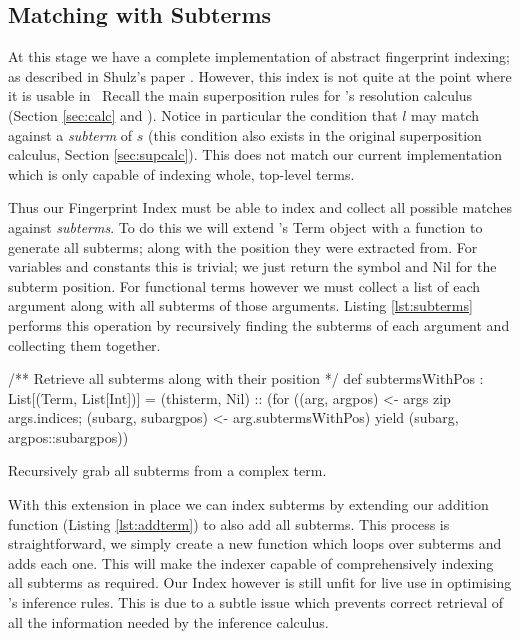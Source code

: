 \subsection{Matching with Subterms}

At this stage we have a complete implementation of abstract fingerprint indexing;
as described in Shulz's paper \cite{shulz12}. However, this index is not
quite at the point where it is usable in \beagle\ 
Recall the main superposition rules for \beagle's resolution calculus (Section \ref{sec:calc} and \cite{baum13}).
Notice in particular the condition that $l$ may match against a \emph{subterm}
of $s$ (this condition also exists in the original superposition calculus, Section \ref{sec:supcalc}).
This does not match our current implementation which is only capable of indexing
whole, top-level terms.

Thus our Fingerprint Index must be able to index and collect all possible matches against \emph{subterms}.
To do this we will extend \beagle's Term object with a function to generate all
subterms; along with the position they were extracted from. For variables and constants
this is trivial; we just return the symbol and Nil for the subterm position. For
functional terms however we must collect a list of each argument along with
all subterms of those arguments. Listing \ref{lst:subterms} performs this
operation by recursively finding the subterms of each argument and collecting
them together. 

\begin{listing}[H]
\begin{scalacode}
/** Retrieve all subterms along with their position */
def subtermsWithPos : List[(Term, List[Int])] = 
  (thisterm, Nil) :: (for 
    ((arg,    argpos)    <- args zip args.indices;
     (subarg, subargpos) <- arg.subtermsWithPos)
      yield  (subarg, argpos::subargpos))
\end{scalacode}
\caption{Recursively grab all subterms from a complex term.}
\label{lst:subterms}
\end{listing}
With this extension in place we can index subterms by extending our addition function
(Listing \ref{lst:addterm}) to also add all subterms. This process is straightforward,
we simply create a new function which loops over subterms and adds each one.
This will make the indexer capable of comprehensively indexing all subterms as required.
Our Index however is still unfit for live use in optimising \beagle's inference rules.
This is due to a subtle issue which prevents correct retrieval of all
the information needed by the inference calculus.

